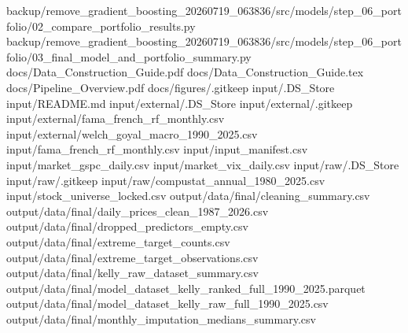 \documentclass[
  11pt,
  a4paper]{article}
\newenvironment{Shaded}{}{}
\newcommand{\NormalTok}[1]{#1}
\begin{document}
\begin{Shaded}
\begin{Highlighting}[]
\NormalTok{backup/remove\_\allowbreak{}gradient\_\allowbreak{}boosting\_\allowbreak{}20260719\_\allowbreak{}063836/src/models/step\_\allowbreak{}06\_\allowbreak{}portfolio/02\_\allowbreak{}compare\_\allowbreak{}portfolio\_\allowbreak{}results.py}
\NormalTok{backup/remove\_\allowbreak{}gradient\_\allowbreak{}boosting\_\allowbreak{}20260719\_\allowbreak{}063836/src/models/step\_\allowbreak{}06\_\allowbreak{}portfolio/03\_\allowbreak{}final\_\allowbreak{}model\_\allowbreak{}and\_\allowbreak{}portfolio\_\allowbreak{}summary.py}
\NormalTok{docs/Data\_\allowbreak{}Construction\_\allowbreak{}Guide.pdf}
\NormalTok{docs/Data\_\allowbreak{}Construction\_\allowbreak{}Guide.tex}
\NormalTok{docs/Pipeline\_\allowbreak{}Overview.pdf}
\NormalTok{docs/figures/.gitkeep}
\NormalTok{input/.DS\_\allowbreak{}Store}
\NormalTok{input/README.md}
\NormalTok{input/external/.DS\_\allowbreak{}Store}
\NormalTok{input/external/.gitkeep}
\NormalTok{input/external/fama\_\allowbreak{}french\_\allowbreak{}rf\_\allowbreak{}monthly.csv}
\NormalTok{input/external/welch\_\allowbreak{}goyal\_\allowbreak{}macro\_\allowbreak{}1990\_\allowbreak{}2025.csv}
\NormalTok{input/fama\_\allowbreak{}french\_\allowbreak{}rf\_\allowbreak{}monthly.csv}
\NormalTok{input/input\_\allowbreak{}manifest.csv}
\NormalTok{input/market\_\allowbreak{}gspc\_\allowbreak{}daily.csv}
\NormalTok{input/market\_\allowbreak{}vix\_\allowbreak{}daily.csv}
\NormalTok{input/raw/.DS\_\allowbreak{}Store}
\NormalTok{input/raw/.gitkeep}
\NormalTok{input/raw/compustat\_\allowbreak{}annual\_\allowbreak{}1980\_\allowbreak{}2025.csv}
\NormalTok{input/stock\_\allowbreak{}universe\_\allowbreak{}locked.csv}
\NormalTok{output/data/final/cleaning\_\allowbreak{}summary.csv}
\NormalTok{output/data/final/daily\_\allowbreak{}prices\_\allowbreak{}clean\_\allowbreak{}1987\_\allowbreak{}2026.csv}
\NormalTok{output/data/final/dropped\_\allowbreak{}predictors\_\allowbreak{}empty.csv}
\NormalTok{output/data/final/extreme\_\allowbreak{}target\_\allowbreak{}counts.csv}
\NormalTok{output/data/final/extreme\_\allowbreak{}target\_\allowbreak{}observations.csv}
\NormalTok{output/data/final/kelly\_\allowbreak{}raw\_\allowbreak{}dataset\_\allowbreak{}summary.csv}
\NormalTok{output/data/final/model\_\allowbreak{}dataset\_\allowbreak{}kelly\_\allowbreak{}ranked\_\allowbreak{}full\_\allowbreak{}1990\_\allowbreak{}2025.parquet}
\NormalTok{output/data/final/model\_\allowbreak{}dataset\_\allowbreak{}kelly\_\allowbreak{}raw\_\allowbreak{}full\_\allowbreak{}1990\_\allowbreak{}2025.csv}
\NormalTok{output/data/final/monthly\_\allowbreak{}imputation\_\allowbreak{}medians\_\allowbreak{}summary.csv}

\end{Highlighting}
\end{Shaded}
\end{document}
